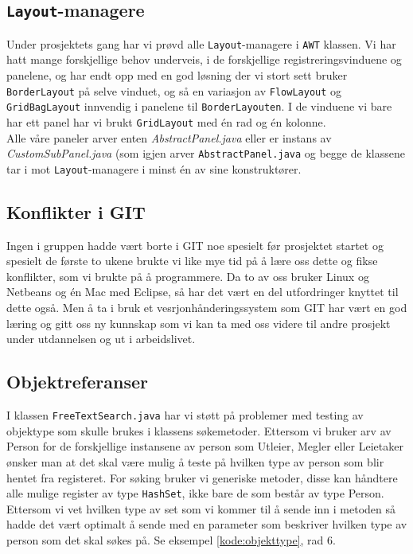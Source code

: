 \subsection{\texttt{Layout}-managere}
Under prosjektets gang har vi prøvd alle \texttt{Layout}-managere i \texttt{AWT} klassen.
Vi har hatt mange forskjellige behov underveis, i de forskjellige registreringsvinduene og panelene, og har endt opp med en god løsning der vi stort sett bruker \texttt{BorderLayout} på selve vinduet, og så en variasjon av \texttt{FlowLayout} og \texttt{GridBagLayout} innvendig i panelene til \texttt{BorderLayouten}.
I de vinduene vi bare har ett panel har vi brukt \texttt{GridLayout} med én rad og én kolonne. \\
Alle våre paneler arver enten \emph{AbstractPanel.java} eller er instans av \emph{CustomSubPanel.java} (som igjen arver \texttt{AbstractPanel.java} og begge de klassene tar i mot \texttt{Layout}-managere i minst én av sine konstruktører.

\subsection{Konflikter i GIT}
Ingen i gruppen hadde vært borte i GIT noe spesielt før prosjektet startet og spesielt de første to ukene brukte vi like mye tid på å lære oss dette og fikse konflikter, som vi brukte på å programmere. Da to av oss bruker Linux og Netbeans og én Mac med Eclipse, så har det vært en del utfordringer knyttet til dette også. Men å ta i bruk et vesrjonhånderingssystem som GIT har vært en god læring og gitt oss ny kunnskap som vi kan ta med oss videre til andre prosjekt under utdannelsen og ut i arbeidslivet.


\subsection{Objektreferanser}
I klassen \texttt{FreeTextSearch.java} har vi støtt på problemer med testing av objektype som skulle brukes i klassens søkemetoder. Ettersom vi bruker arv av Person for de forskjellige instansene av person som Utleier, Megler eller Leietaker ønsker man at det skal være mulig å teste på hvilken type av person som blir hentet fra registeret. 
For søking bruker vi generiske metoder, disse kan håndtere alle mulige register av type \texttt{HashSet}, ikke bare de som består av type Person. 
Ettersom vi vet hvilken type av set som vi kommer til å sende inn i metoden så hadde det vært optimalt å sende med en parameter som beskriver hvilken type av person som det skal søkes på. Se eksempel \ref{kode:objekttype}, rad 6. 

